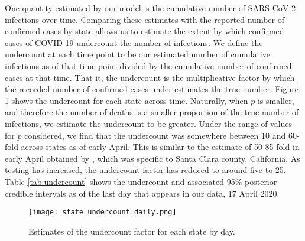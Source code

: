 \documentclass[11pt]{article}
\theoremstyle{plain}
\newcommand{\1}{\mathbf 1}
\begin{document}
 \label{tab:R0} 

One quantity estimated by our model is the cumulative number of SARS-CoV-2 infections over time. Comparing these estimates with the reported number of confirmed cases by state allows us to estimate the extent by which confirmed cases of COVID-19 undercount the number of infections. We define the undercount at each time point to be our estimated number of cumulative infections as of that time point divided by the cumulative number of confirmed cases at that time. That it, the undercount is the multiplicative factor by which the recorded number of confirmed cases under-estimates the true number. Figure \ref{fig:undercount} shows the undercount for each state across time. Naturally, when $p$ is smaller, and therefore the number of deaths is a smaller proportion of the true number of infections, we estimate the undercount to be greater. Under the range of values for $p$ considered, we find that the undercount was somewhere between 10 and 60-fold across states as of early April. This is similar to the estimate of 50-85 fold in early April obtained by \citet{Bendavid2020.04.14.20062463}, which was specific to Santa Clara county, California. As testing has increased, the undercount factor has reduced to around five to 25. Table \ref{tab:undercount} shows the undercount and associated 95\% posterior credible intervals as of the last day that appears in our data, 17 April 2020. 

\begin{figure}[h]
\texttt{[image: state\_undercount\_daily.png]}
\caption{ \label{fig:undercount} Estimates of the undercount factor for each state by day. }
\end{figure}


\end{document}

